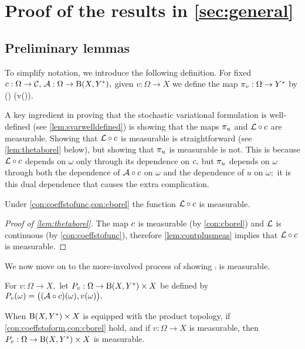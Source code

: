 \section[Proof of the results in Section \MakeLowercase{\ref{sec:general}}]{Proof of the results in \cref{sec:general}}\label{sec:genproof}

\subsection{Preliminary lemmas}\label{sec:prelemmanary}
To simplify notation, we introduce the following definition.
For fixed $\coeff:\Omega\rightarrow\cC,\,\toform:\Omega\rightarrow\homspace,$ given $v:\Omega\rightarrow X$ we define the map $\pi_{v}:\Omega\rightarrow Y^{*}$ by
\beq\label{eq:comp}
\comp(\omega) \de \mleft[\mleft(\toform\circ\coeff\mright)(\omega)\mright]\mleft(v(\omega)\mright).
\eeq
\ede

A key ingredient in proving that the stochastic variational formulation is well-defined (see \cref{lem:svarwelldefined}) is showing that the maps $\pi_{u}$ and $\mathcal L\circ c$ are measurable. Showing that $\mathcal L\circ c $ is measurable is straightforward (see \cref{lem:thetaborel} below), but showing that $\pi_{u}$ is measurable is not. This is because $\mathcal L\circ c$ depends on $\omega$ only through its dependence on $c,$ but $\pi_{u}$ depends on $\omega$ through both the dependence of $\mathcal A\circ c$ on $\omega$ and the dependence of $u$ on $\omega;$ it is this dual dependence that causes the extra complication.

 \label{lem:thetaborel}
Under \cref{con:coeffstofunc,con:cborel} the function $\mathcal L\circ c$ is measurable.
\ele

\begin{proof}[Proof of \cref{lem:thetaborel}]
The map $c$ is measurable (by \cref{con:cborel})
  and $\mathcal L$ is continuous  (by \cref{con:coeffstofunc}), therefore \cref{lem:contplusmeas} implies that $\mathcal L\circ c $ is measurable.
\end{proof}

We now move on to the more-involved process of showing $\comp$ is measurable.

For $v:\Omega\rightarrow X,$ let $\toprod:\Omega\rightarrow \homspace \times X$ be defined by $\toprod(\omega) = \big(\mleft(\toform\circ\coeff\mright)(\omega),v(\omega)\big).$
\ede

\label{lem:Pmeas}
When $\homspace \times X$ is equipped with the product top\-ol\-ogy,  if \cref{con:coeffstoform,con:cborel} hold, and if $v:\Omega\rightarrow X$ is measurable, then $\toprod:\Omega\rightarrow \homspace\times X$ is measurable.
\ele

